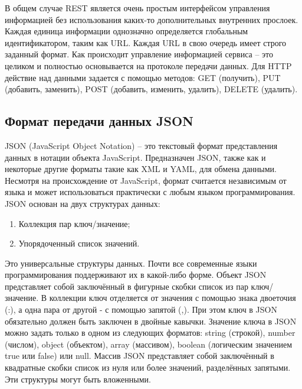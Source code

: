 В общем случае REST является очень простым интерфейсом управления информацией без использования каких-то дополнительных внутренних прослоек. Каждая единица информации однозначно определяется глобальным идентификатором, таким как URL. Каждая URL в свою очередь имеет строго заданный формат. Как происходит управление информацией сервиса – это целиком и полностью основывается на протоколе передачи данных. Для HTTP действие над данными задается с помощью методов: GET (получить), PUT (добавить, заменить), POST (добавить, изменить, удалить), DELETE (удалить).

\subsection{Формат передачи данных JSON}
JSON (JavaScript Object Notation) – это текстовый формат представления данных в нотации объекта JavaScript. Предназначен JSON, также как и некоторые другие форматы такие как XML и YAML, для обмена данными. Несмотря на происхождение от JavaScript, формат считается независимым от языка и может использоваться практически с любым языком программирования. JSON основан на двух структурах данных:
\begin{enumerate}
	\item Коллекция пар ключ/значение;
	\item Упорядоченный список значений.
\end{enumerate}

Это универсальные структуры данных. Почти все современные языки программирования поддерживают их в какой-либо форме. Объект JSON представляет собой заключённый в фигурные скобки список из пар ключ/значение. В коллекции ключ отделяется от значения с помощью знака двоеточия (:), а одна пара от другой - с помощью запятой (,). При этом ключ в JSON обязательно должен быть заключен в двойные кавычки. Значение ключа в JSON можно задать только в одном из следующих форматов: string (строкой), number (числом), object (объектом), array (массивом), boolean (логическим значением true или false) или null. Массив JSON представляет собой заключённый в квадратные скобки список из нуля или более значений, разделённых запятыми. Эти структуры могут быть вложенными.

